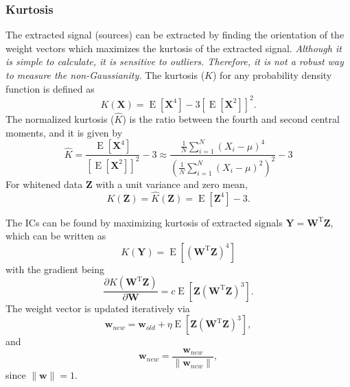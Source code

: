 \subsubsection{Kurtosis\label{Sec:DR:ICA:MnG:Kurtosis}}
The extracted signal (sources) can be extracted by finding the orientation of the weight vectors which maximizes the kurtosis of the extracted signal. \textit{Although it is simple to calculate, it is sensitive to outliers. Therefore, it is not a robust way to measure the non-Gaussianity.} The kurtosis ($K$) for any probability density function is defined as
\begin{equation}
	K(\mathbf{X})=\operatorname{E}\left[\mathbf{X}^4\right]-3\left[\operatorname{E}\left[\mathbf{X}^2\right]\right]^2.
\end{equation}
The normalized kurtosis ($\hat{K}$) is the ratio between the fourth and second central moments, and it is given by
\begin{equation}
	\hat{K}=\frac{\operatorname{E}\left[\mathbf{X}^4\right]}{\left[\operatorname{E}\left[\mathbf{X}^2\right]\right]^2}-3\approx \frac{\frac{1}{N}\sum_{i=1}^N\left(X_i-\mu\right)^4}{\left(\frac{1}{N}\sum_{i=1}^N\left(X_i-\mu\right)^2\right)^2}-3
\end{equation}
For whitened data $\mathbf{Z}$ with a unit variance and zero mean,
\begin{equation}
	K(\mathbf{Z})=\hat{K}(\mathbf{Z})=\operatorname{E}\left[\mathbf{Z}^4\right]-3.
\end{equation}

The ICs can be found by maximizing kurtosis of extracted signals $\mathbf{Y}=\mathbf{W}^{\operatorname{T}}\mathbf{Z}$, which can be written as
\begin{equation}
	K(\mathbf{Y})={\operatorname{E}}\left[\left(\mathbf{W}^{\operatorname{T}}\mathbf{Z}\right)^4\right]
\end{equation}
with the gradient being
\begin{equation}
	\frac{\partial K(\mathbf{W}^{\operatorname{T}}\mathbf{Z})}{\partial \mathbf{W}}=c{\operatorname{E}}\left[\mathbf{Z}\left(\mathbf{W}^{\operatorname{T}}\mathbf{Z}\right)^3\right].
\end{equation}
The weight vector is updated iteratively via
\begin{equation}
	\mathbf{w}_{new}=\mathbf{w}_{old}+\eta {\operatorname{E}}\left[\mathbf{Z}\left(\mathbf{W}^{\operatorname{T}}\mathbf{Z}\right)^3\right],
\end{equation}
and
\begin{equation}
	\mathbf{w}_{new}=\frac{\mathbf{w}_{new}}{\lVert\mathbf{w}_{new}\rVert},
\end{equation}
since $\lVert\mathbf{w}\rVert=1$.

